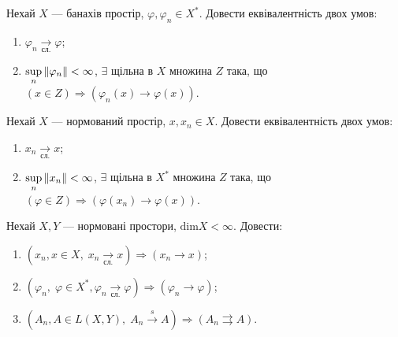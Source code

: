 
\begin{exercise}
    Нехай $X$ --- банахів простір, $\varphi, \varphi_n \in X^{*}$.
    Довести еквівалентність двох умов:
    \begin{enumerate}
        \item $\varphi_n \underset{\text{сл.}}{\rightarrow} \varphi$;
        \item $\underset{n}{\sup}\left\lVert\varphi_n\right\rVert < \infty$, $\exists$ щільна
        в $X$ множина $Z$ така, що $(x \in Z) \Rightarrow (\varphi_n (x) \rightarrow \varphi(x))$.
    \end{enumerate}
\end{exercise}

\begin{exercise}
    Нехай $X$ --- нормований простір, $x, x_n \in X$.
    Довести еквівалентність двох умов:
    \begin{enumerate}
        \item $x_n \underset{\text{сл.}}{\rightarrow} x$;
        \item $\underset{n}{\sup}\left\lVert x_n\right\rVert < \infty$, $\exists$ щільна
        в $X^{*}$ множина $Z$ така, що $(\varphi \in Z) \Rightarrow (\varphi (x_n) \rightarrow \varphi(x))$.
    \end{enumerate}
\end{exercise}

\begin{exercise}
    Нехай $X, Y$ --- нормовані простори, $\mathrm{dim}X < \infty$. Довести:
    \begin{enumerate}
        \item $\left(x_n, x \in X, \; x_n \underset{\text{сл.}}{\rightarrow} x\right) \Rightarrow \left(x_n \rightarrow x\right)$;
        \item $\left(\varphi_n, \; \varphi \in X^{*}, \varphi_n \underset{\text{сл.}}{\rightarrow} \varphi\right) \Rightarrow \left(\varphi_n \rightarrow \varphi\right)$;
        \item $\left(A_n, A \in L(X, Y), \; A_n \overset{s}{\rightarrow} A\right) \Rightarrow \left(A_n \rightrightarrows A\right)$.
    \end{enumerate}
\end{exercise}

